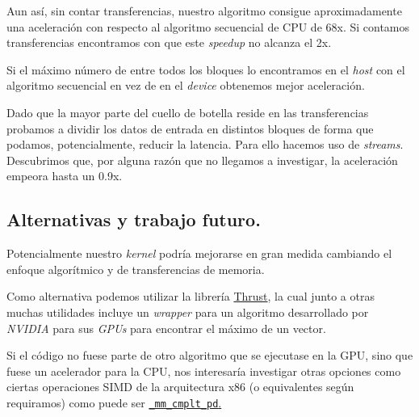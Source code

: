 Aun así, sin contar transferencias, nuestro algoritmo consigue aproximadamente una aceleración con respecto al algoritmo secuencial de CPU
de 68x. Si contamos transferencias encontramos con que este \textit{speedup} no alcanza el 2x.

Si el máximo número de entre todos los bloques lo encontramos en el \textit{host} con el algoritmo secuencial en vez de en el \textit{device}
obtenemos mejor aceleración.

Dado que la mayor parte del cuello de botella reside en las transferencias probamos a dividir los datos de entrada en distintos
bloques de forma que podamos, potencialmente, reducir la latencia. Para ello hacemos uso de \textit{streams}.
Descubrimos que, por alguna razón que no llegamos a investigar, la aceleración empeora hasta un 0.9x.

\subsection{Alternativas y trabajo futuro.}

Potencialmente nuestro \textit{kernel} podría mejorarse en gran medida cambiando el enfoque algorítmico y de transferencias de memoria.

Como alternativa podemos utilizar la librería \href{https://github.com/NVIDIA/thrust}{Thrust}, la cual junto a otras muchas utilidades
incluye un \textit{wrapper} para un algoritmo desarrollado por \textit{NVIDIA} para sus \textit{GPUs} para encontrar el máximo de un vector.

Si el código no fuese parte de otro algoritmo que se ejecutase en la GPU, sino que fuese un acelerador para la CPU, nos interesaría investigar
otras opciones como ciertas operaciones SIMD de la arquitectura x86 (o equivalentes según requiramos) como puede ser
\href{https://www.intel.com/content/www/us/en/docs/intrinsics-guide/index.html#text=_mm_cmplt_pd&ig_expand=1173}{\texttt{\_mm\_cmplt\_pd}.}
